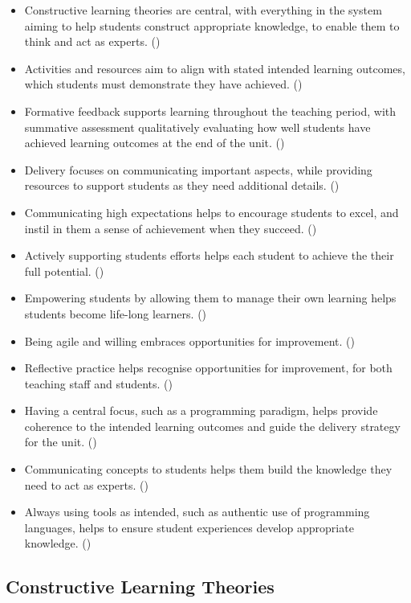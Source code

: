 \begin{itemize}[noitemsep,nolistsep]
	\item Constructive learning theories are central, with everything in the system aiming to help students construct appropriate knowledge, to enable them to think and act as experts. ()
	\item Activities and resources aim to align with stated intended learning outcomes, which students must demonstrate they have achieved. ()
	\item Formative feedback supports learning throughout the teaching period, with summative assessment qualitatively evaluating how well students have achieved learning outcomes at the end of the unit. ()
	\item Delivery focuses on communicating important aspects, while providing resources to support students as they need additional details. ()
	\item Communicating high expectations helps to encourage students to excel, and instil in them a sense of achievement when they succeed. ()
	\item Actively supporting students efforts helps each student to achieve the their full potential.  ()
	\item Empowering students by allowing them to manage their own learning helps students become life-long learners. ()
	\item Being agile and willing embraces opportunities for improvement. ()
	\item Reflective practice helps recognise opportunities for improvement, for both teaching staff and students. ()
	\item Having a central focus, such as a programming paradigm, helps provide coherence to the intended learning outcomes and guide the delivery strategy for the unit.  ()
	\item Communicating concepts to students helps them build the knowledge they need to act as experts. ()
	\item Always using tools as intended, such as authentic use of programming languages, helps to ensure student experiences develop appropriate knowledge. ()
\end{itemize}

\subsection{Constructive Learning Theories} %
\label{sub:constructive_learning_theories}

